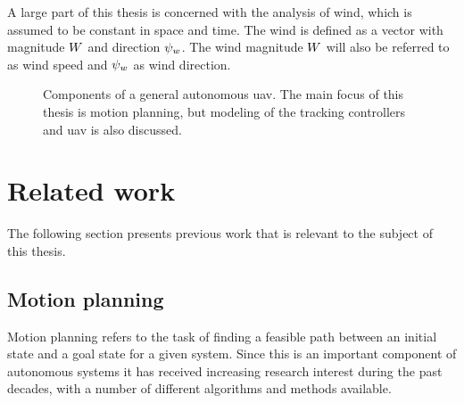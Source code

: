 A large part of this thesis is concerned with the analysis of wind, which is assumed to be constant in space and time. The wind is defined as a vector with magnitude 
$W$ and direction $\psi_w$. The wind magnitude $W$ will also be referred to as wind speed and $\psi_w$ as wind direction. 

\begin{figure}
    \begin{center}
    \end{center}
    \caption{Components of a general autonomous \ac{uav}. The main focus of this thesis is motion planning, but modeling of the tracking controllers and \ac{uav} is also discussed.}
    \label{fig:autonomous}
\end{figure}

\section{Related work}
The following section presents previous work that is relevant to the subject of this thesis.

\subsection{Motion planning}
Motion planning refers to the task of finding a feasible path between an initial state and a goal state for a given system. 
Since this is an important component of autonomous systems it has 
received increasing research interest during the past decades, with a number of 
different algorithms and methods available. 

